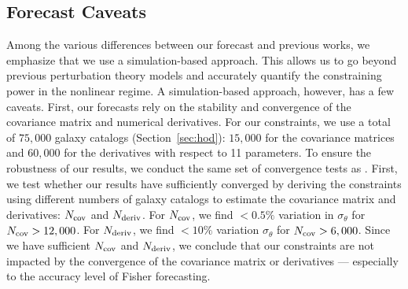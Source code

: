 \subsection{Forecast Caveats}
Among the various differences between our forecast and previous works, we
emphasize that we use a simulation-based approach. This allows us to go beyond previous
perturbation theory models and accurately quantify the constraining power
in the nonlinear regime. A simulation-based approach, however, has a few caveats. 
First, our forecasts rely on the stability and convergence of the covariance 
matrix and numerical derivatives. 
For our constraints, we use a total of $75,000$ galaxy catalogs (Section~\ref{sec:hod}): 
$15,000$ for the covariance matrices and $60,000$ for the derivatives with 
respect to 11 parameters. To ensure the robustness
of our results, we conduct the same set of convergence tests as
\cite{hahn2020}. 
First, we test whether our results have sufficiently converged by deriving the 
constraints using different numbers of galaxy catalogs to estimate the covariance 
matrix and derivatives: $N_{\rm cov}$ and $N_{\rm deriv}$. For $N_{\rm cov}$,
we find $< 0.5\%$ variation in $\sigma_\theta$ for $N_{\rm cov} > 12,000$.
For $N_{\rm deriv}$, 
we find $< 10\%$ variation $\sigma_\theta$ for $N_{\rm cov} > 6,000$.
Since we have sufficient $N_{\rm cov}$ and $N_{\rm deriv}$, we conclude that 
our constraints are not impacted by the convergence of the covariance matrix 
or derivatives --- especially to the accuracy level of Fisher forecasting. 

